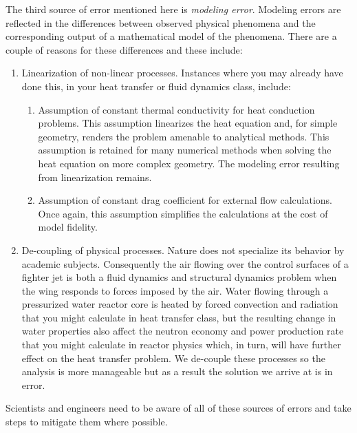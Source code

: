 The third source of error mentioned here is \emph{modeling error}.  Modeling errors are reflected in the differences between observed physical phenomena and the corresponding output of a mathematical model of the phenomena.  There are a couple of reasons for these differences and these include:
\begin{enumerate}
\item Linearization of non-linear processes.  Instances where you may already have done this, in your heat transfer or fluid dynamics class, include:
\begin{enumerate}
\item Assumption of constant thermal conductivity for heat conduction problems.  This assumption linearizes the heat equation and, for simple geometry, renders the problem amenable to analytical methods.  This assumption is retained for many numerical methods when solving the heat equation on more complex geometry.  The modeling error resulting from linearization remains.

\item Assumption of constant drag coefficient for external flow calculations.  Once again, this assumption simplifies the calculations at the cost of model fidelity.
\end{enumerate}

\item De-coupling of physical processes.  Nature does not specialize its behavior by academic subjects.  Consequently the air flowing over the control surfaces of a fighter jet is both a fluid dynamics and structural dynamics problem when the wing responds to forces imposed by the air.  Water flowing through a pressurized water reactor core is heated by forced convection and radiation that you might calculate in heat transfer class, but the resulting change in water properties also affect the neutron economy and power production rate that you might calculate in reactor physics which, in turn, will have further effect on the heat transfer problem.  We de-couple these processes so the analysis is more manageable but as a result the solution we arrive at is in error.  

\end{enumerate}  
Scientists and engineers need to be aware of all of these sources of errors and take steps to mitigate them where possible.



